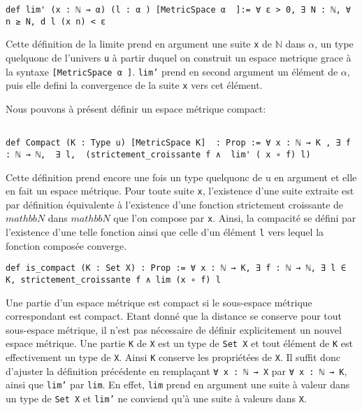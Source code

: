 \documentclass[a4paper, 12pt]{article}
\newcommand{\lean}[1]{\texttt{#1}}
\begin{document}
\begin{verbatim}
def lim' (x : ℕ → α) (l : α ) [MetricSpace α  ]:= ∀ ε > 0, ∃ N : ℕ, ∀ n ≥ N, d l (x n) < ε
\end{verbatim}

Cette définition de la limite prend en argument une suite \lean{x} de $\mathbb{N}$ dans $\alpha$, un type quelquonc de l'univers \lean{u} à partir duquel on construit un espace metrique grace à la syntaxe \lean{[MetricSpace α  ]}. \lean{lim'} prend en second argument un élément de $\alpha$, puis elle defini la convergence de la suite \lean{x} vers cet élément.

Nous pouvons à présent définir un espace métrique compact:

\begin{verbatim}

def Compact (K : Type u) [MetricSpace K]  : Prop := ∀ x : ℕ → K , ∃ f : ℕ → ℕ,  ∃ l,  (strictement_croissante f ∧  lim' ( x ∘ f) l)
\end{verbatim}

Cette définition prend encore une fois un type quelquonc  de u en argument et elle en fait un espace métrique. Pour toute suite \lean{x}, l'existence d'une suite extraite est par définition équivalente à l'existence d'une fonction strictement croissante de $mathbb{N} $ dans $mathbb{N} $  que l'on compose par \lean{x}. Ainsi, la compacité se défini  par l'existence d'une telle fonction ainsi que celle d'un élément  \lean{l} vers lequel la fonction composée converge.

\begin{verbatim}
def is_compact (K : Set X) : Prop := ∀ x : ℕ → K, ∃ f : ℕ → ℕ, ∃ l ∈ K, strictement_croissante f ∧ lim (x ∘ f) l

\end{verbatim}

Une partie d'un espace métrique est compact si le sous-espace métrique correspondant est compact. Etant donné que la distance se conserve pour tout sous-espace métrique, il n'est pas nécessaire de définir explicitement un nouvel espace métrique. Une partie \lean{K} de \lean{X} est un type de \lean{Set X} et tout élément de  \lean{K} est effectivement un type de \lean{X}. Ainsi  \lean{K} conserve les propriétées de \lean{X}. Il suffit donc d'ajuster la définition précédente en remplaçant \lean{∀ x : ℕ → X} par \lean{∀ x : ℕ → K}, ainsi que \lean{lim'} par \lean{lim}. En effet, \lean{lim} prend en argument une suite à valeur dans un type de \lean{Set X} et \lean{lim'} ne conviend qu'à une suite à valeurs dans \lean{X}.
\end{document}
